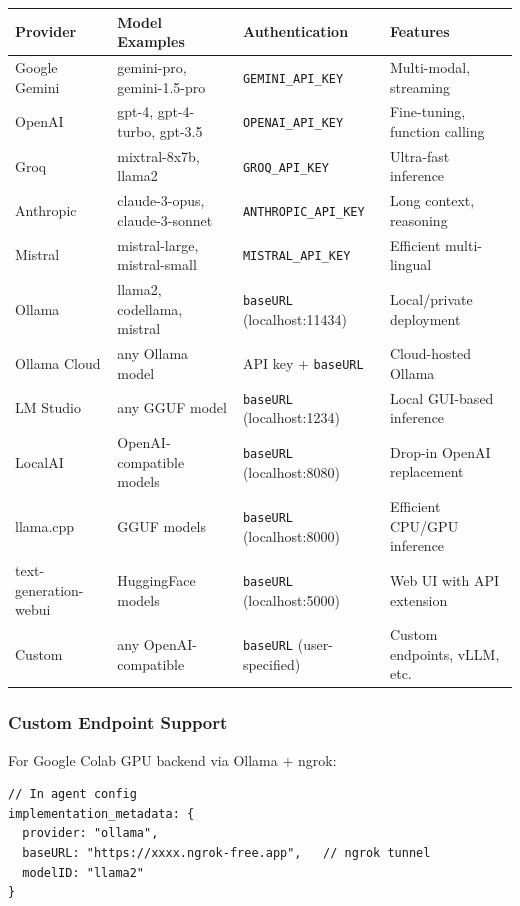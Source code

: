 \documentclass[11pt,a4paper]{report}
\newcommand{\code}[1]{\texttt{\small #1}}
\begin{document}
\begin{longtable}{@{}L{3.1cm} L{3.3cm} L{4.2cm} L{3.9cm}@{}}
\toprule
\textbf{Provider} & \textbf{Model Examples} & \textbf{Authentication} & \textbf{Features}\\
\midrule\endhead
Google Gemini & gemini-pro, gemini-1.5-pro & \code{GEMINI\_API\_KEY} & Multi-modal, streaming\\
OpenAI & gpt-4, gpt-4-turbo, gpt-3.5 & \code{OPENAI\_API\_KEY} & Fine-tuning, function calling\\
Groq & mixtral-8x7b, llama2 & \code{GROQ\_API\_KEY} & Ultra-fast inference\\
Anthropic & claude-3-opus, claude-3-sonnet & \code{ANTHROPIC\_API\_KEY} & Long context, reasoning\\
Mistral & mistral-large, mistral-small & \code{MISTRAL\_API\_KEY} & Efficient multi-lingual\\
Ollama & llama2, codellama, mistral & \code{baseURL} (localhost:11434) & Local/private deployment\\
Ollama Cloud & any Ollama model & API key + \code{baseURL} & Cloud-hosted Ollama\\
LM Studio & any GGUF model & \code{baseURL} (localhost:1234) & Local GUI-based inference\\
LocalAI & OpenAI-compatible models & \code{baseURL} (localhost:8080) & Drop-in OpenAI replacement\\
llama.cpp & GGUF models & \code{baseURL} (localhost:8000) & Efficient CPU/GPU inference\\
text-generation-webui & HuggingFace models & \code{baseURL} (localhost:5000) & Web UI with API extension\\
Custom & any OpenAI-compatible & \code{baseURL} (user-specified) & Custom endpoints, vLLM, etc.\\
\bottomrule
\end{longtable}

\subsubsection{Custom Endpoint Support}

For Google Colab GPU backend via Ollama + ngrok:

\begin{lstlisting}[style=tsstyle]
// In agent config
implementation_metadata: {
  provider: "ollama",
  baseURL: "https://xxxx.ngrok-free.app",   // ngrok tunnel
  modelID: "llama2"
}
\end{lstlisting}
\end{document}
